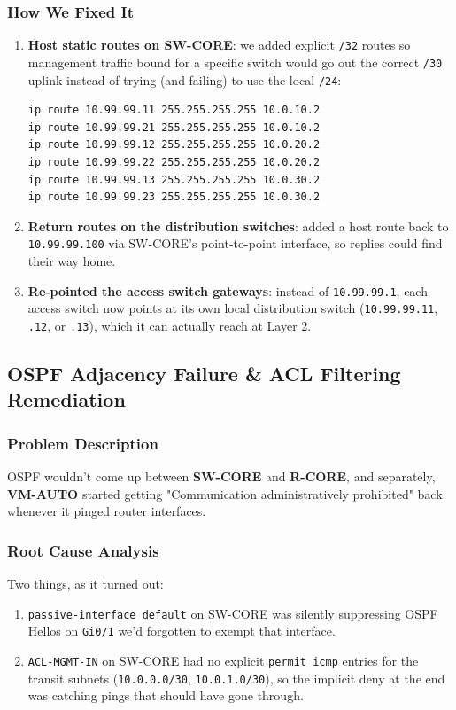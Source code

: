 \documentclass[11pt,a4paper]{article}
\begin{document}
\subsubsection{How We Fixed It}
\begin{enumerate}
    \item \textbf{Host static routes on SW-CORE}: we added explicit \texttt{/32} routes so management traffic bound for a specific switch would go out the correct \texttt{/30} uplink instead of trying (and failing) to use the local \texttt{/24}:
\begin{lstlisting}[style=ciscostyle]
ip route 10.99.99.11 255.255.255.255 10.0.10.2
ip route 10.99.99.21 255.255.255.255 10.0.10.2
ip route 10.99.99.12 255.255.255.255 10.0.20.2
ip route 10.99.99.22 255.255.255.255 10.0.20.2
ip route 10.99.99.13 255.255.255.255 10.0.30.2
ip route 10.99.99.23 255.255.255.255 10.0.30.2
\end{lstlisting}
    \item \textbf{Return routes on the distribution switches}: added a host route back to \texttt{10.99.99.100} via SW-CORE's point-to-point interface, so replies could find their way home.
    \item \textbf{Re-pointed the access switch gateways}: instead of \texttt{10.99.99.1}, each access switch now points at its own local distribution switch (\texttt{10.99.99.11}, \texttt{.12}, or \texttt{.13}), which it can actually reach at Layer 2.
\end{enumerate}

\subsection{OSPF Adjacency Failure \& ACL Filtering Remediation}

\subsubsection{Problem Description}
OSPF wouldn't come up between \textbf{SW-CORE} and \textbf{R-CORE}, and separately, \textbf{VM-AUTO} started getting "Communication administratively prohibited" back whenever it pinged router interfaces.

\subsubsection{Root Cause Analysis}
Two things, as it turned out:
\begin{enumerate}
    \item \texttt{passive-interface default} on SW-CORE was silently suppressing OSPF Hellos on \texttt{Gi0/1} we'd forgotten to exempt that interface.
    \item \texttt{ACL-MGMT-IN} on SW-CORE had no explicit \texttt{permit icmp} entries for the transit subnets (\texttt{10.0.0.0/30}, \texttt{10.0.1.0/30}), so the implicit deny at the end was catching pings that should have gone through.
\end{enumerate}
\end{document}

